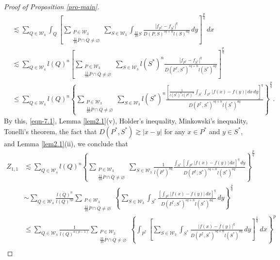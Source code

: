 \documentclass[11pt,twoside]{article}
\def\cw{\mathcal W}
\def\sxing{S^{*}}
\def\pxing{P^{*}}
\theoremstyle{mylem}
\theoremstyle{definition}
\numberwithin{equation}{section}
\begin{document}
\begin{proof}[Proof of Proposition \ref{pro-main}]
\begin{align*}
&\lesssim \sum_{Q\in\cw_4} \int_{Q} \left[  \sum_{\substack{P\in\mathcal{W}_3\\ \frac{11}{10}\overline{P}\cap\overline{Q} \neq\varnothing}} \sum_{S\in\mathcal{W}_3}\int_{\frac{11}{10}S}\frac{| f_{\pxing}-f_{\sxing}|^q
}{D(P,S)^{s q + n}l(S)^{aq}}\,dy \right]^{\frac{p}{q}}\,dx \\
&\lesssim \sum_{Q\in\cw_4} l(Q)^n \left[  \sum_{\substack{P\in\mathcal{W}_3\\ \frac{11}{10}\overline{P}\cap\overline{Q} \neq\varnothing}} \sum_{S\in\mathcal{W}_3} l(\sxing)^{n} \frac{| f_{\pxing}-f_{\sxing}|^q
}{D(\pxing,\sxing)^{s q + n}l(\sxing)^{aq}}  \right]^{\frac{p}{q}}  \\
&\leq \sum_{Q\in\cw_4} l(Q)^n \left\{\sum_{\substack{P\in\mathcal{W}_3\\ \frac{11}{10}\overline{P}\cap\overline{Q} \neq\varnothing}} \sum_{S\in\mathcal{W}_3} l(\sxing)^{n} \frac{\left[ \frac{1}{l(\sxing)^n l(\pxing)^n} \int_{\sxing} \int_{\pxing} |f(x)-f(y)|\,dx\,dy \right]^q
}{D(\pxing,\sxing)^{s q + n}l(\sxing)^{aq}}  \right\}^{\frac{p}{q}}. 
\end{align*}
By this, \eqref{eqn-7.1}, Lemma \ref{lem2.1}(v), H$\ddot{\text{o}}$lder's inequality, Minkowski's inequality, Tonelli's theorem, the fact that $D(P^*,S^*)\gtrsim |x-y|$ for any $x\in P^*$ and $y\in S^*$, and Lemma \ref{lem2.1}(ii), we conclude that
\begin{align}\label{eqn-3.13}
Z_{1,1}&\lesssim \sum_{Q\in\cw_4} l(Q)^n \left\{ \sum_{\substack{P\in\mathcal{W}_3\\ \frac{11}{10}\overline{P}\cap\overline{Q} \neq\varnothing}} \sum_{S\in\mathcal{W}_3} \frac{1}{ l(\pxing)^{nq}} \frac{  \int_{\sxing} [\int_{\pxing} |f(x)-f(y)|\,dx]^q\,dy 
}{D(\pxing,\sxing)^{s q + n}l(\sxing)^{aq}}  \right\}^{\frac{p}{q}} \nonumber  \\
&\sim \sum_{Q\in\cw_4} \frac{l(Q)^n}{l(Q)^{np}}\sum_{\substack{P\in\mathcal{W}_3\\ \frac{11}{10}\overline{P}\cap\overline{Q} \neq\varnothing}} \left\{ \sum_{S\in\mathcal{W}_3} \int_{\sxing} \frac{   [\int_{\pxing} |f(x)-f(y)|\,dx]^q 
}{D(\pxing,\sxing)^{s q + n}l(\sxing)^{aq}}\,dy \right\}^{\frac{p}{q}} \nonumber \\
&\leq \sum_{Q\in\cw_4} \frac{1}{l(Q)^{n(p-1)}}\sum_{\substack{P\in\mathcal{W}_3\\ \frac{11}{10}\overline{P}\cap\overline{Q} \neq\varnothing}} \left\{ \int_{\pxing} \left[\sum_{S\in\mathcal{W}_3}\int_{\sxing} \frac{ |f(x)-f(y)|^q 
}{D(\pxing,\sxing)^{s q + n}l(\sxing)^{aq}}\,dy \right]^{\frac{1}{q}} \,dx \right\}^p \nonumber \\

\end{align}
\end{proof}
\end{document}
